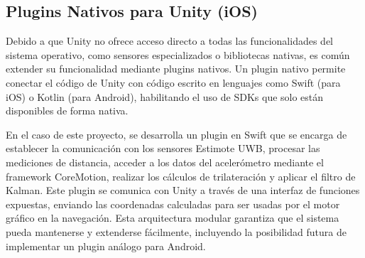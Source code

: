 \subsection{Plugins Nativos para Unity (iOS)}
{\justify Debido a que Unity no ofrece acceso directo a todas las funcionalidades del sistema operativo, como sensores especializados o bibliotecas nativas, es común extender su funcionalidad mediante plugins nativos. Un plugin nativo permite conectar el código de Unity con código escrito en lenguajes como Swift (para iOS) o Kotlin (para Android), habilitando el uso de SDKs que solo están disponibles de forma nativa.

En el caso de este proyecto, se desarrolla un plugin en Swift que se encarga de establecer la comunicación con los sensores Estimote UWB, procesar las mediciones de distancia, acceder a los datos del acelerómetro mediante el framework CoreMotion, realizar los cálculos de trilateración y aplicar el filtro de Kalman. Este plugin se comunica con Unity a través de una interfaz de funciones expuestas, enviando las coordenadas calculadas para ser usadas por el motor gráfico en la navegación. Esta arquitectura modular garantiza que el sistema pueda mantenerse y extenderse fácilmente, incluyendo la posibilidad futura de implementar un plugin análogo para Android.}
\newpage